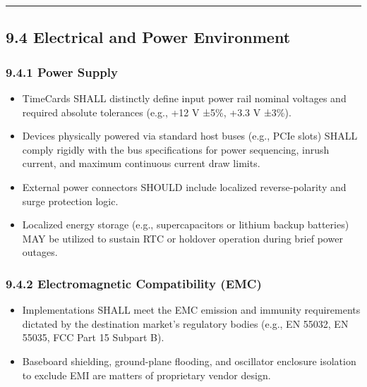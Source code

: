 \begin{center}\rule{0.5\linewidth}{0.5pt}\end{center}

\subsection{9.4 Electrical and Power
Environment}\label{electrical-and-power-environment}

\subsubsection{9.4.1 Power Supply}\label{power-supply}

\begin{itemize}
\tightlist
\item
  TimeCards SHALL distinctly define input power rail nominal voltages
  and required absolute tolerances (e.g., +12 V ±5\%, +3.3 V ±3\%).\\
\item
  Devices physically powered via standard host buses (e.g., PCIe slots)
  SHALL comply rigidly with the bus specifications for power sequencing,
  inrush current, and maximum continuous current draw limits.\\
\item
  External power connectors SHOULD include localized reverse-polarity
  and surge protection logic.\\
\item
  Localized energy storage (e.g., supercapacitors or lithium backup
  batteries) MAY be utilized to sustain RTC or holdover operation during
  brief power outages.
\end{itemize}

\subsubsection{9.4.2 Electromagnetic Compatibility
(EMC)}\label{electromagnetic-compatibility-emc}

\begin{itemize}
\tightlist
\item
  Implementations SHALL meet the EMC emission and immunity requirements
  dictated by the destination market's regulatory bodies (e.g., EN
  55032, EN 55035, FCC Part 15 Subpart B).\\
\item
  Baseboard shielding, ground-plane flooding, and oscillator enclosure
  isolation to exclude EMI are matters of proprietary vendor design.
\end{itemize}

